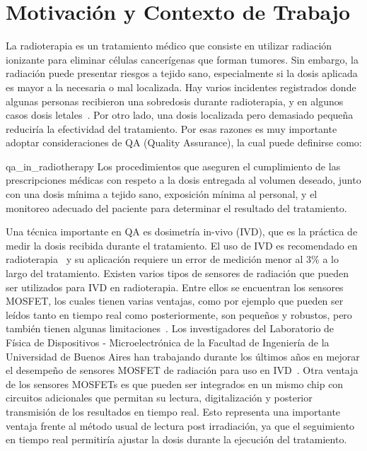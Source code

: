 \documentclass[a4paper, twoside, 11pt]{report}
\begin{document}
\FloatBarrier
\section{Motivación y Contexto de Trabajo}

La radioterapia es un tratamiento médico que consiste en utilizar radiación ionizante para eliminar células cancerígenas que forman tumores. Sin embargo, la radiación puede presentar riesgos a tejido sano, especialmente si la dosis aplicada es mayor a la necesaria o mal localizada. Hay varios incidentes registrados donde algunas personas recibieron una sobredosis durante radioterapia, y en algunos casos dosis letales~\cite{accidentaly_exposures}. Por otro lado, una dosis localizada pero demasiado pequeña reduciría la efectividad del tratamiento. Por esas razones es muy importante adoptar consideraciones de QA (Quality Assurance), la cual puede definirse como:

\begin{displaycquote}[traducido de][]{qa_in_radiotherapy}
Los procedimientos que aseguren el cumplimiento de las prescripciones médicas con respeto a la dosis entregada al volumen deseado, junto con una dosis mínima a tejido sano, exposición mínima al personal, y el monitoreo adecuado del paciente para determinar el resultado del tratamiento.
\end{displaycquote}

Una técnica importante en QA es dosimetría in-vivo (IVD), que es la práctica de medir la dosis recibida durante el tratamiento. El uso de IVD es recomendado en radioterapia~\cite{AAPM-1994}\cite{ICRP-2000} y su aplicación requiere un error de medición menor al 3\% a lo largo del tratamiento. Existen varios tipos de sensores de radiación que pueden ser utilizados para IVD en radioterapia. Entre ellos se encuentran los sensores MOSFET, los cuales tienen varias ventajas, como por ejemplo que pueden ser leídos tanto en tiempo real como posteriormente, son pequeños y robustos, pero también tienen algunas limitaciones~\cite{electronic_dosimetry}. Los investigadores del Laboratorio de Física de Dispositivos - Microelectrónica de la Facultad de Ingeniería de la Universidad de Buenos Aires han trabajando durante los últimos años en mejorar el desempeño de sensores MOSFET de radiación para uso en IVD~\cite{mosfet_mismatch_amplification}\cite{6MV_LINAC}. Otra ventaja de los sensores MOSFETs es que pueden ser integrados en un mismo chip con circuitos adicionales que permitan su lectura, digitalización y posterior transmisión de los resultados en tiempo real. Esto representa una importante ventaja frente al método usual de lectura post irradiación, ya que el seguimiento en tiempo real permitiría ajustar la dosis durante la ejecución del tratamiento.
\end{document}
